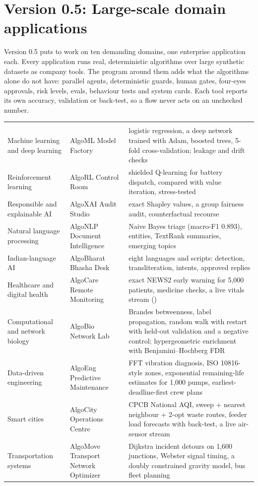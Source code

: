 \chapter{Version 0.5: Large-scale domain applications}
\label{ch:v05}

Version 0.5 puts \algolang{} to work on ten demanding domains, one enterprise application each. Every application runs real, deterministic algorithms over large synthetic datasets as company tools. The \algolang{} program around them adds what the algorithms alone do not have: parallel agents, deterministic guards, human gates, four-eyes approvals, risk levels, evals, behaviour tests and system cards. Each tool reports its own accuracy, validation or back-test, so a flow never acts on an unchecked number.

\begin{center}
\small
\begin{tabularx}{\linewidth}{@{}L{3.2cm}L{3.6cm}Y@{}}
\toprule
{} &  & \\
\goldrule
Machine learning and deep learning & AlgoML Model Factory & logistic regression, a deep network trained with Adam, boosted trees, 5-fold cross-validation; leakage and drift checks\\
Reinforcement learning & AlgoRL Control Room & shielded Q-learning for battery dispatch, compared with value iteration, stress-tested\\
Responsible and explainable AI & AlgoXAI Audit Studio & exact Shapley values, a group fairness audit, counterfactual recourse\\
Natural language processing & AlgoNLP Document Intelligence & Naive Bayes triage (macro-F1 0.893), entities, TextRank summaries, emerging topics\\
Indian-language AI & AlgoBharat Bhasha Desk & eight languages and scripts: detection, transliteration, intents, approved replies\\
Healthcare and digital health & AlgoCare Remote Monitoring & exact NEWS2 early warning for 5,000 patients, medicine checks, a live vitals stream ()\\
Computational and network biology & AlgoBio Network Lab & Brandes betweenness, label propagation, random walk with restart with held-out validation and a negative control; hypergeometric enrichment with Benjamini--Hochberg FDR\\
Data-driven engineering & AlgoEng Predictive Maintenance & FFT vibration diagnosis, ISO 10816-style zones, exponential remaining-life estimates for 1,000 pumps, earliest-deadline-first crew plans\\
Smart cities & AlgoCity Operations Centre & CPCB National AQI, sweep + nearest neighbour + 2-opt waste routes, feeder load forecasts with back-test, a live air-sensor stream\\
Transportation systems & AlgoMove Transport Network Optimizer & Dijkstra incident detours on 1,600 junctions, Webster signal timing, a doubly constrained gravity model, bus fleet planning\\
\bottomrule
\end{tabularx}
\end{center}

